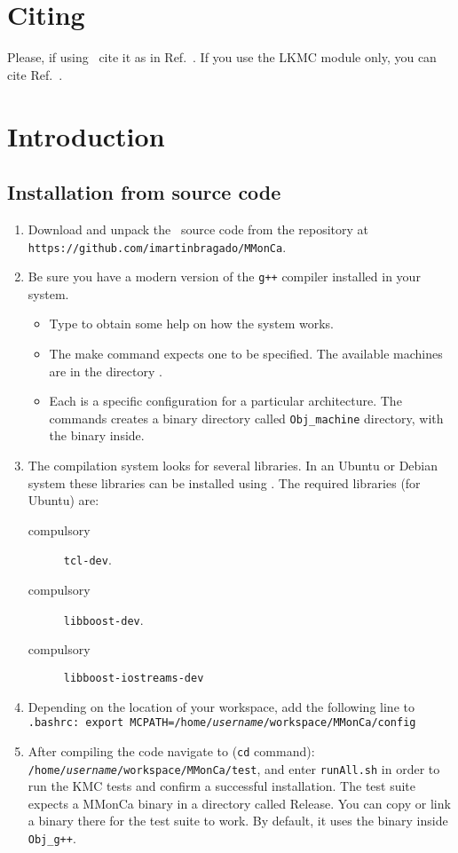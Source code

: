 \section{Citing}

Please, if using \MMonCa\ cite it as in Ref.~\cite{MARTIN-BRAGADO-CPC13}.
If you use the LKMC module only, you can cite Ref.~\cite{MARTIN-BRAGADO-APL11}.

\section{Introduction}
\subsection{Installation from source code}
\begin{enumerate}
 \item Download and unpack the \MMonCa\ source code from the repository at  {\tt
https://github.com/imartinbragado/MMonCa}.
 \item Be sure you have a modern version of the {\tt g++} compiler installed in your system. 
\begin{itemize}
\item Type  to obtain some help on how the  system works.
\item The make command expects one  to be specified. The available machines are in the directory .
\item Each  is a specific configuration for a particular architecture. The  commands creates a binary directory called {\tt Obj\verb+_+machine} directory, with the  binary inside.
\end{itemize}
\item The compilation system looks for several libraries. In an Ubuntu or Debian system these libraries can be installed using . The required libraries (for Ubuntu) are:
\begin{description}
\item[compulsory] {\tt tcl-dev}.
\item[compulsory] {\tt libboost-dev}.
\item[compulsory] {\tt libboost-iostreams-dev}
\end{description}
 \item Depending on the location of your workspace, add the following line to {\tt .bashrc: export MCPATH=/home/\textit{username}/workspace/MMonCa/config}
 \item After compiling the code navigate to ({\tt cd} command): \\
{\tt /home/\textit{username}/workspace/MMonCa/test}, and enter {\tt runAll.sh} in order to run the KMC tests and confirm a successful installation. The test suite expects a MMonCa binary in a directory called Release. You can copy or link a binary there for the test suite to work. By default, it uses the binary inside \verb-Obj_g++-.
\end{enumerate}



